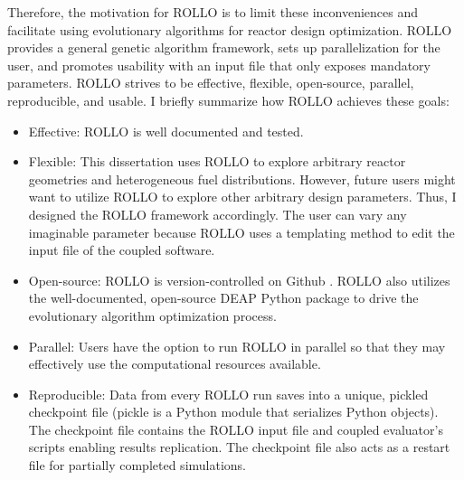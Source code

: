 Therefore, the motivation for \gls{ROLLO} is to limit these inconveniences and 
facilitate using evolutionary algorithms for reactor design optimization.
\gls{ROLLO} provides a general genetic algorithm framework, sets up 
parallelization for the user, and promotes usability with an input file 
that only exposes mandatory parameters.
\gls{ROLLO} strives to be effective, flexible, open-source, parallel, reproducible, 
and usable. 
I briefly summarize how \gls{ROLLO} achieves these goals:
\begin{itemize}
    \item Effective: \gls{ROLLO} is well documented and tested.
    \item Flexible: This dissertation uses \gls{ROLLO} to 
    explore arbitrary reactor geometries and heterogeneous fuel distributions. 
    However, future users might want to utilize \gls{ROLLO} 
    to explore other arbitrary design parameters. Thus, I designed the \gls{ROLLO}
    framework accordingly. The user can vary any imaginable parameter 
    because \gls{ROLLO} uses a templating method to edit the input file of the 
    coupled software.
    \item Open-source: \gls{ROLLO} is version-controlled on Github 
    \cite{chee_rollo_2021}. \gls{ROLLO} also utilizes the well-documented, open-source 
    \gls{DEAP} \cite{fortin_deap_2012} Python package to drive the evolutionary 
    algorithm optimization process.
    \item Parallel: Users have the option to run \gls{ROLLO} in parallel so that 
    they may effectively use the computational resources available. 
    \item Reproducible: Data from every \gls{ROLLO} run saves into a unique, pickled 
    checkpoint file (pickle is a Python module that serializes Python objects). 
    The checkpoint file contains the \gls{ROLLO} input file and coupled evaluator's 
    scripts enabling results replication. The checkpoint file also acts as a restart 
    file for partially completed simulations. 
\end{itemize}


